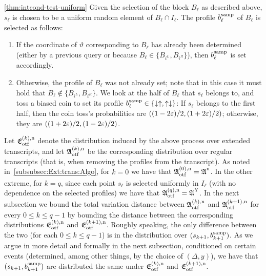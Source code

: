 \begin{proofof}{\cref{thm:intcond-test-uniform}}
Given the selection of the block $B_\ell$ as described above, $s_\ell$ is chosen
to be a uniform random element of $B_\ell \cap I_\ell$.
The profile $b^{\rm samp}_\ell$ of $B_\ell$ is selected as follows:
\begin{enumerate}\label{discussion:uniform:lb:drawing:on:the:fly}
\item If the coordinate of $\vartheta$ corresponding to $B_\ell$
has already been determined (either by a previous query or because
$B_\ell \in \{B_{i^L},B_{i^R}\}$), then $b^{\rm samp}_\ell$ is set accordingly.

\item Otherwise, the profile of $B_\ell$ was not already set;
note that in this case it must hold that $B_\ell \notin \{B_{i^L},B_{i^R}\}$.
 We look at the half of $B_\ell$ that $s_\ell$ belongs to, and
toss a biased coin to set its profile $b^{\rm samp}_\ell\in\{\downarrow\uparrow,
\uparrow\downarrow\}$:  If $s_\ell$ belongs to the first half, then
the coin
toss's probabilities are $((1-{2}\varepsilon)/2, (1+{2}\varepsilon)/2)$; otherwise, they
are $((1+{2}\varepsilon)/2, (1-{2}\varepsilon)/2)$.
\end{enumerate}
Let $\mathfrak{E}^{(k), \rm n}_{\rm otf}$ denote the distribution induced by the above process
over extended transcripts, and let $\mathfrak{A}^{(k), \rm n}_{\rm otf}$ be the
corresponding distribution over regular transcripts (that is, when removing the profiles
from the transcript). As noted in~\cref{subsubsec:Ext:trans:Algo}, for
$k=0$ we have that $\mathfrak{A}^{(0), \rm n}_{\rm otf} = \mathfrak{A}^{\vphantom{(0),}\rm n}_{\vphantom{otf}}$.
In the other extreme, for $k=q$, since each point $s_\ell$ is selected uniformly
in $I_\ell$ (with no dependence on the selected profiles) we have that
$\mathfrak{A}^{(q), \rm n}_{\rm otf} = \mathfrak{A}^{\vphantom{(0),}\rm Y}_{\vphantom{otf}}$.
In the next subsection we bound the total variation distance between
$\mathfrak{A}^{(k), \rm n}_{\rm otf}$ and $\mathfrak{A}^{(k+1), \rm n}_{\rm otf}$
for every $0 \leq k \leq q-1$
by bounding the distance between the corresponding distributions
$\mathfrak{E}^{(k), \rm n}_{\rm otf}$ and $\mathfrak{E}^{(k+1), \rm n}_{\rm otf}$.
Roughly speaking, the only difference between the two (for each $0 \leq k\leq q-1$) is in the distribution over $(s_{k+1},b^{\rm samp}_{k+1})$. As we argue in more detail and
formally in the next subsection, conditioned on certain events (determined, among other
things, by the choice of $(\Delta,y)$), we have that $(s_{k+1},b^{\rm samp}_{k+1})$
are distributed the same under
$\mathfrak{E}^{(k), \rm n}_{\rm otf}$ and $\mathfrak{E}^{(k+1), \rm n}_{\rm otf}$.


\end{proofof}
